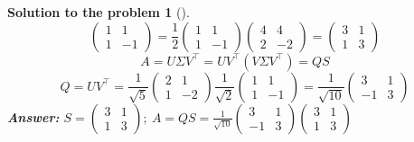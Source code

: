 \documentclass[12pt,a4]{article}
\newtheorem{solution}{Solution to the problem}
\newcommand{\answer}[1]{\textbf{Answer:} #1}
\begin{document}
\begin{solution}[]
\[\begin{pmatrix}
1 & 1 \\
1 & -1
\end{pmatrix}
=
\frac1{2}
\begin{pmatrix}
1 & 1 \\
1 & -1
\end{pmatrix}
\begin{pmatrix}
4 & 4 \\
2 & -2
\end{pmatrix}
=
\begin{pmatrix}
3 & 1 \\
1 & 3
\end{pmatrix}
\]
\[
A = U\Sigma V^\top = UV^\top (V\Sigma V^\top) = QS
\]
\[
Q = UV^\top = 
\frac1{\sqrt5}
\begin{pmatrix}
2 & 1 \\
1 & -2
\end{pmatrix}
\frac1{\sqrt2}
\begin{pmatrix}
1 & 1 \\
1 & -1
\end{pmatrix}
=
\frac1{\sqrt{10}}
\begin{pmatrix}
3 & 1 \\
-1 & 3
\end{pmatrix}
\]
\answer{
$
S = \begin{pmatrix}
3 & 1 \\
1 & 3
\end{pmatrix};~
A = QS = 
\frac1{\sqrt{10}}
\begin{pmatrix}
3 & 1 \\
-1 & 3
\end{pmatrix}
\begin{pmatrix}
3 & 1 \\
1 & 3
\end{pmatrix}
$
}\\[5pt]
\end{solution}
\end{document}
